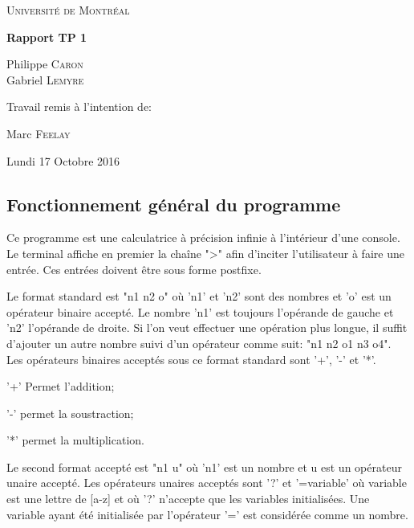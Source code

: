 \documentclass[]{report}
\begin{document}
	\begin{titlepage}
		\centering
		{\scshape\LARGE Université de Montréal \par}
		\vspace{1.5cm}
		{\huge\bfseries Rapport TP 1\par}
		\vspace{2cm}
		{\Large Philippe \textsc{Caron}\\Gabriel \textsc{Lemyre}\par}
		\vfill
		Travail remis à l'intention de:\par
		Marc \textsc{Feelay}	
		\vfill
		{\large Lundi 17 Octobre 2016\par}
	\end{titlepage}
	\newpage
	\begin{normalsize}
		\section*{\LARGE Fonctionnement général du programme}\vspace{4mm}
		Ce programme est une calculatrice à précision infinie à l'intérieur d'une console. Le terminal affiche en premier la chaîne "\textgreater\hspace{1mm}" afin d'inciter l'utilisateur à faire une entrée. Ces entrées doivent être sous forme postfixe.
		\vspace{4mm}
		\par Le format standard est "n1 n2 o" où 'n1' et 'n2' sont des nombres et 'o' est un opérateur binaire accepté. Le nombre 'n1' est toujours l'opérande de gauche et 'n2' l'opérande de droite. Si l'on veut effectuer une opération plus longue, il suffit d'ajouter un autre nombre suivi d'un opérateur comme suit: "n1 n2 o1 n3 o4".
		Les opérateurs binaires acceptés sous ce format standard sont '+', '-' et '*'.
		\begin{description}[noitemsep]
			\item \hspace{4mm}'+' Permet l'addition;
			\item \hspace{4mm}'-' permet la soustraction;
			\item \hspace{4mm}'*' permet la multiplication.
		\end{description}
		\par Le second format accepté est "n1 u" où 'n1' est un nombre et u est un opérateur unaire accepté. Les opérateurs unaires acceptés sont '?' et '=variable' où variable est une lettre de [a-z] et où '?' n'accepte que les variables initialisées. Une variable ayant été initialisée par l'opérateur '=' est considérée comme un nombre.

\end{normalsize}
\end{document}
